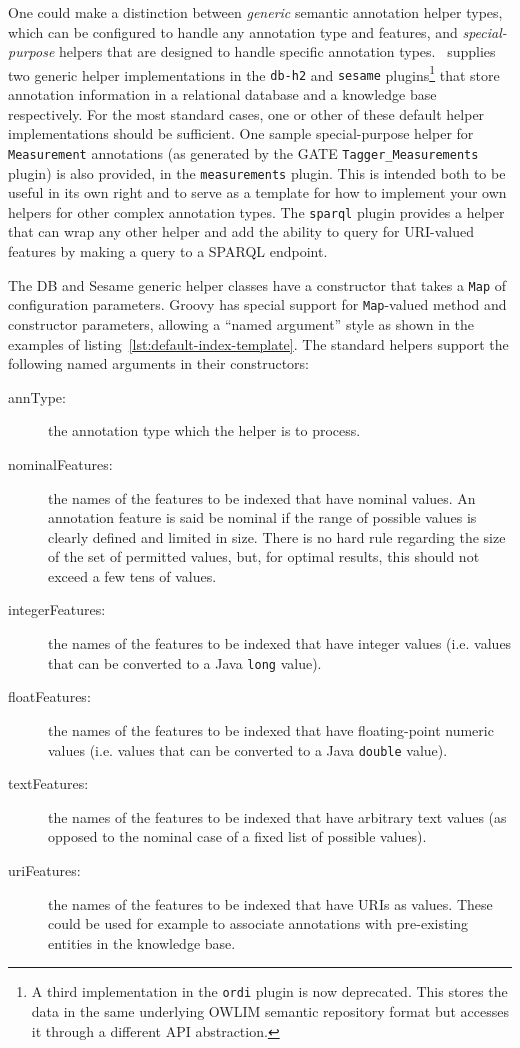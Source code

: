 One could make a distinction between {\em generic} semantic annotation helper
types, which can be configured to handle any annotation type and features, and
{\em special-purpose} helpers that are designed to handle specific annotation
types.  \Mimir\ supplies two generic helper implementations in the {\tt db-h2}
and {\tt sesame} plugins\footnote{A third implementation in the {\tt ordi}
plugin is now deprecated.  This stores the data in the same underlying OWLIM
semantic repository format but accesses it through a different API
abstraction.} that store annotation information in a relational database and a
knowledge base respectively.  For the most standard cases, one or other of
these default helper implementations should be sufficient.  One sample
special-purpose helper for {\tt Measurement} annotations (as generated by the
GATE {\tt Tagger\_Measurements} plugin) is also provided, in the
{\tt measurements} plugin.  This is intended both to be useful in its own right
and to serve as a template for how to implement your own helpers for other
complex annotation types.  The {\tt sparql} plugin provides a helper that can
wrap any other helper and add the ability to query for URI-valued features by
making a query to a SPARQL endpoint.

The DB and Sesame generic helper classes have a constructor that takes a
{\tt Map} of configuration parameters.  Groovy has special support for
{\tt Map}-valued method and constructor parameters, allowing a ``named
argument'' style as shown in the examples of
listing~\ref{lst:default-index-template}.  The standard helpers support the
following named arguments in their constructors:

\begin{description}
\item[annType:] the annotation type which the helper is to process.
\item[nominalFeatures:] the names of the features to be indexed that have
  nominal values. An annotation feature is said be nominal if the range of
  possible values is clearly defined and limited in size. There is no hard rule
  regarding the size of the set of permitted values, but, for optimal results,
  this should not exceed a few tens of values.
\item[integerFeatures:] the names of the features to be indexed that have
  integer values (i.e. values that can be converted to a Java {\tt long}
  value).
\item[floatFeatures:] the names of the features to be indexed that have
  floating-point numeric values (i.e. values that can be converted to a Java
  {\tt double} value).
\item[textFeatures:] the names of the features to be indexed that have
  arbitrary text values (as opposed to the nominal case of a fixed list of
  possible values).
\item[uriFeatures:] the names of the features to be indexed that have
  URIs as values. These could be used for example to associate annotations with
  pre-existing entities in the knowledge base.
\end{description}


